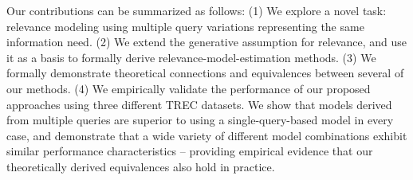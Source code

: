 %
\noindent Our contributions can be summarized as follows: 
(1) We explore a novel task: relevance modeling using multiple query
variations representing the same information need.
(2) We extend the generative assumption for relevance, and use it as
a basis to formally derive relevance-model-estimation methods.
(3) We formally demonstrate theoretical connections and equivalences
between several of our methods.
(4) We empirically validate the performance of our proposed
approaches using three different TREC datasets.
We show that models derived from multiple queries are superior to
using a single-query-based model in every case, and demonstrate that a wide
variety of different model combinations exhibit similar performance
characteristics -- providing empirical evidence that our
theoretically derived equivalences also hold in practice.

